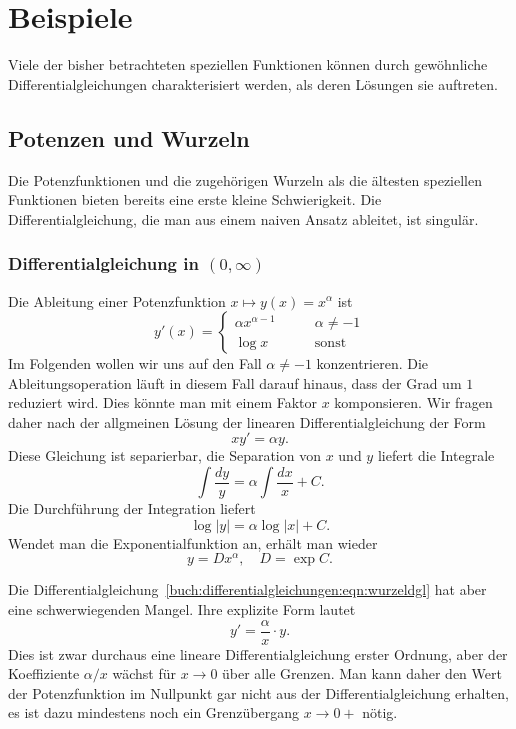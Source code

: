 %
%
%
\section{Beispiele
\label{buch:differentialgleichungen:section:beispiele}}
Viele der bisher betrachteten speziellen Funktionen können 
durch gewöhnliche Differentialgleichungen charakterisiert werden,
%
als deren Lösungen sie auftreten.

%
%
\subsection{Potenzen und Wurzeln
\label{buch:differentialgleichungen:subsection:potenzen-und-wurzeln}}
Die Potenzfunktionen und die zugehörigen Wurzeln als die ältesten
speziellen Funktionen bieten bereits eine erste kleine Schwierigkeit.
%
%
Die Differentialgleichung, die man aus einem naiven Ansatz ableitet,
ist singulär.

%
%
\subsubsection{Differentialgleichung in $(0,\infty)$}
Die Ableitung einer Potenzfunktion $x\mapsto y(x)=x^\alpha$ ist
\[
y'(x) =
\begin{cases}
\alpha x^{\alpha-1} &\qquad \alpha\ne -1\\
\log x&\qquad\text{sonst}
\end{cases}
\]
Im Folgenden wollen wir uns auf den Fall $\alpha\ne -1$ konzentrieren.
Die Ableitungsoperation läuft in diesem Fall darauf hinaus, dass der
Grad um $1$ reduziert wird.
Dies könnte man mit einem Faktor $x$ komponsieren.
Wir fragen daher nach der allgmeinen Lösung der linearen
Differentialgleichung der Form
\begin{equation}
xy' = \alpha y.
\label{buch:differentialgleichungen:eqn:wurzeldgl}
\end{equation}
Diese Gleichung ist separierbar, die Separation von $x$ und $y$ liefert
die Integrale
\[
\int \frac{dy}{y} = \alpha \int \frac{dx}{x} + C.
\]
Die Durchführung der Integration liefert 
\[
\log |y| = \alpha \log|x| + C.
\]
Wendet man die Exponentialfunktion an, erhält man wieder
\[
y = Dx^\alpha,\quad D=\exp C.
\]

Die Differentialgleichung~\eqref{buch:differentialgleichungen:eqn:wurzeldgl}
hat aber eine schwerwiegenden Mangel.
%
Ihre explizite Form lautet
\begin{equation}
y' = \frac{\alpha}{x}\cdot y.
\label{buch:differentialgleichungen:eqn:wurzelsing}
\end{equation}
Dies ist zwar durchaus eine lineare Differentialgleichung erster Ordnung,
aber der Koeffiziente $\alpha/x$ wächst für $x\to 0$ über alle Grenzen.
Man kann daher den Wert der Potenzfunktion im Nullpunkt gar nicht aus der
Differentialgleichung erhalten, es ist dazu mindestens noch ein Grenzübergang
$x\to 0+$ nötig.

